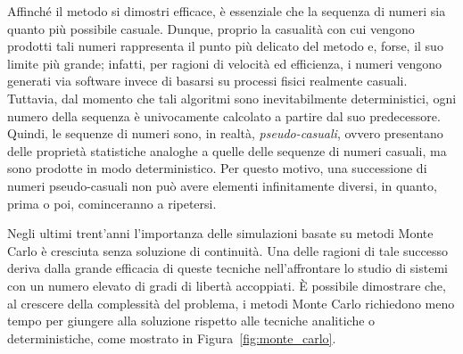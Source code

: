 Affinché il metodo si dimostri efficace, è essenziale che la sequenza di numeri sia quanto più possibile casuale.
Dunque, proprio la casualità con cui vengono prodotti tali numeri rappresenta il punto più delicato del metodo e, forse, il suo limite più grande; infatti, per ragioni di velocità ed efficienza, i numeri vengono generati via software invece di basarsi su processi fisici realmente casuali.
Tuttavia, dal momento che tali algoritmi sono inevitabilmente deterministici, ogni numero della sequenza è univocamente calcolato a partire dal suo predecessore. 
Quindi, le sequenze di numeri sono, in realtà, \emph{pseudo-casuali}, ovvero presentano delle proprietà statistiche analoghe a quelle delle sequenze di numeri casuali, ma sono prodotte in modo deterministico. 
Per questo motivo, una successione di numeri pseudo-casuali non può avere elementi infinitamente diversi, in quanto, prima o poi, cominceranno a ripetersi.

Negli ultimi trent'anni l'importanza delle simulazioni basate su metodi Monte Carlo è cresciuta senza soluzione di continuità. 
Una delle ragioni di tale successo deriva dalla grande efficacia di queste tecniche nell'affrontare lo studio di sistemi con un numero elevato di gradi di libertà accoppiati. 
È possibile dimostrare che, al crescere della complessità del problema, i metodi Monte Carlo richiedono meno tempo per giungere alla soluzione rispetto alle tecniche analitiche o deterministiche, come mostrato in Figura~\ref{fig:monte_carlo}.


